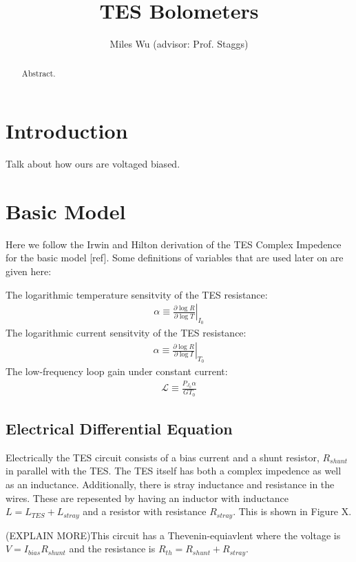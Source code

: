 \documentclass[letterpaper,10pt]{article}
\begin{document}
\title{TES Bolometers}
\author{Miles Wu (advisor: Prof. Staggs)}
\maketitle

\begin{abstract}
Abstract.
\end{abstract}

\section{Introduction}

Talk about how ours are voltaged biased.

\section{Basic Model}
Here we follow the Irwin and Hilton derivation of the TES Complex Impedence for the basic model [ref]. Some definitions of variables that are used later on are given here:

The logarithmic temperature sensitvity of the TES resistance: \begin{eqnarray}\alpha \equiv \left.\frac{\partial \log R}{\partial \log T}\right|_{I_0}\end{eqnarray}
The logarithmic current sensitvity of the TES resistance:
\begin{eqnarray}
	\alpha \equiv \left.\frac{\partial \log R}{\partial \log I}\right|_{T_0} \label{log1}
\end{eqnarray}
The low-frequency loop gain under constant current:
\begin{eqnarray}
	\mathcal{L} \equiv \frac{P_{J_0} \alpha}{G T_0} \label{log2}
\end{eqnarray}

\subsection{Electrical Differential Equation}
Electrically the TES circuit consists of a bias current and a shunt resistor, $R_{shunt}$ in parallel with the TES. The TES itself has both a complex impedence as well as an inductance. Additionally, there is stray inductance and resistance in the wires. These are repesented by having an inductor with inductance $L = L_{TES} + L_{stray}$ and a resistor with resistance $R_{stray}$. This is shown in Figure X.

(EXPLAIN MORE)This circuit has a Thevenin-equiavlent where the voltage is $V = I_{bias} R_{shunt}$ and the resistance is $R_{th} = R_{shunt} + R_{stray}$.
\end{document}
